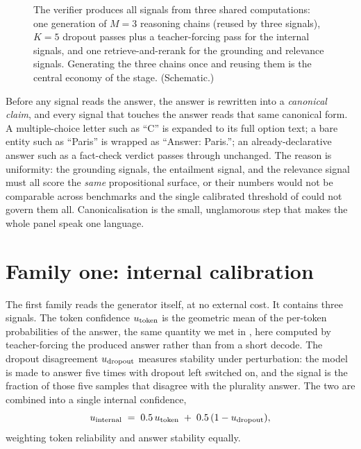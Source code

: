 \begin{figure}[htbp]
{}
\caption[The verifier data flow]{The verifier produces all signals from three
shared computations: one generation of $M{=}3$ reasoning chains (reused by three
signals), $K{=}5$ dropout passes plus a teacher-forcing pass for the internal
signals, and one retrieve-and-rerank for the grounding and relevance signals.
Generating the three chains once and reusing them is the central economy of the
stage. (Schematic.)}
\label{fig:verifier-flow}
\end{figure}

\begin{precise}
Before any signal reads the answer, the answer is rewritten into a \emph{canonical
claim}, and every signal that touches the answer reads that same canonical form.
A multiple-choice letter such as ``C'' is expanded to its full option text; a bare
entity such as ``Paris'' is wrapped as ``Answer: Paris.''; an already-declarative
answer such as a fact-check verdict passes through unchanged. The reason is
uniformity: the grounding signals, the entailment signal, and the relevance signal
must all score the \emph{same} propositional surface, or their numbers would not be
comparable across benchmarks and the single calibrated threshold of
 could not govern them all. Canonicalisation is the small,
unglamorous step that makes the whole panel speak one language.
\end{precise}

\section{Family one: internal calibration}
\label{sec:verifier-internal}

The first family reads the generator itself, at no external cost. It contains three
signals. The token confidence $u_{\text{token}}$ is the geometric mean of the per-token
probabilities of the answer, the same quantity we met in , here
computed by teacher-forcing the produced answer rather than from a short decode. The
dropout disagreement $u_{\text{dropout}}$ measures stability under perturbation: the model is
made to answer five times with dropout left switched on, and the signal is the
fraction of those five samples that disagree with the plurality answer. The two are
combined into a single internal confidence,
\[
  u_{\text{internal}} \;=\; 0.5\,u_{\text{token}} \;+\; 0.5\,(1 - u_{\text{dropout}}),
\]
weighting token reliability and answer stability equally.


